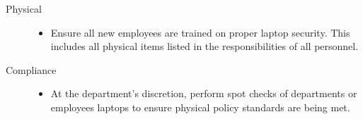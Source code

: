 \documentclass[DIV=calc, paper=a4, fontsize=11pt, twocolumn]{scrartcl}	 %
\begin{document}
\begin{description}
  \item[Physical] \hfill
    \begin{itemize}
    \item Ensure all new employees are trained on proper laptop security.
    This includes all physical items listed in the responsibilities of all
    personnel.
    \end{itemize}
  \item[Compliance] \hfill
    \begin{itemize}
    \item At the department's discretion, perform spot checks of departments
    or employees laptops to ensure physical policy standards are being met.
    \end{itemize}
\end{description}
\end{document}
